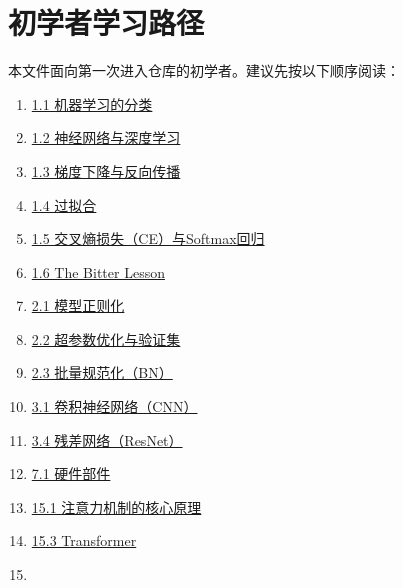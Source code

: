\hypertarget{ux521dux5b66ux8005ux5b66ux4e60ux8defux5f84}{%
\chapter{初学者学习路径}\label{ux521dux5b66ux8005ux5b66ux4e60ux8defux5f84}}

本文件面向第一次进入仓库的初学者。建议先按以下顺序阅读：

\begin{enumerate}
\def\labelenumi{\arabic{enumi}.}
\tightlist
\item
  \href{docs/01-deep-learning/01-深度学习基础理论/01-01-机器学习的分类.md}{1.1 机器学习的分类}
\item
  \href{docs/01-deep-learning/01-深度学习基础理论/01-02-神经网络与深度学习.md}{1.2 神经网络与深度学习}
\item
  \href{docs/01-deep-learning/01-深度学习基础理论/01-03-梯度下降与反向传播.md}{1.3 梯度下降与反向传播}
\item
  \href{docs/01-deep-learning/01-深度学习基础理论/01-04-过拟合.md}{1.4 过拟合}
\item
  \href{docs/01-deep-learning/01-深度学习基础理论/01-05-交叉熵损失-CE与Softmax回归.md}{1.5 交叉熵损失（CE）与Softmax回归}
\item
  \href{docs/01-deep-learning/01-深度学习基础理论/01-06-The-Bitter-Lesson.md}{1.6 The Bitter Lesson}
\item
  \href{docs/01-deep-learning/02-神经网络训练的常用方法/02-01-模型正则化.md}{2.1 模型正则化}
\item
  \href{docs/01-deep-learning/02-神经网络训练的常用方法/02-02-超参数优化与验证集.md}{2.2 超参数优化与验证集}
\item
  \href{docs/01-deep-learning/02-神经网络训练的常用方法/02-03-批量规范化-BN.md}{2.3 批量规范化（BN）}
\item
  \href{docs/01-deep-learning/03-卷积神经网络/03-01-卷积神经网络-CNN.md}{3.1 卷积神经网络（CNN）}
\item
  \href{docs/01-deep-learning/03-卷积神经网络/03-04-残差网络-ResNet.md}{3.4 残差网络（ResNet）}
\item
  \href{docs/01-deep-learning/07-计算性能与AI-Infra/07-01-硬件部件.md}{7.1 硬件部件}
\item
  \href{docs/03-large-language-model/15-注意力机制与Transformer/15-01-注意力机制的核心原理.md}{15.1 注意力机制的核心原理}
\item
  \href{docs/03-large-language-model/15-注意力机制与Transformer/15-03-Transformer.md}{15.3 Transformer}
\item

\end{enumerate}
